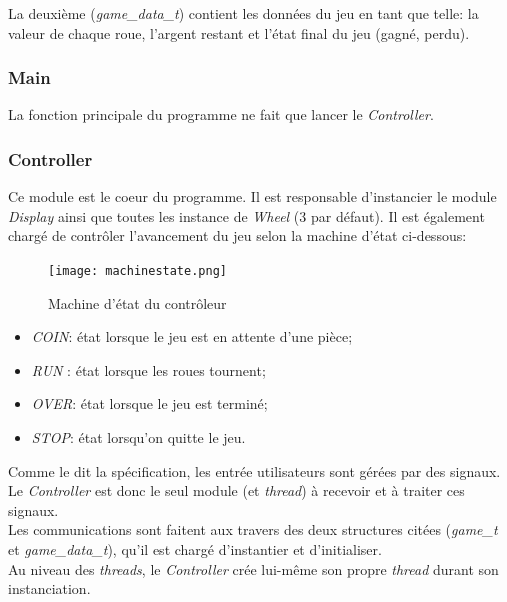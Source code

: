 \documentclass[11pt, a4paper]{article}
\begin{document}
La deuxième (\textit{game\_data\_t}) contient les données du jeu en tant que telle:
la valeur de chaque roue, l'argent restant et l'état final du jeu (gagné, perdu).

\subsubsection{Main}
La fonction principale du programme ne fait que lancer le \textit{Controller}.

\newpage

\subsubsection{Controller}
Ce module est le coeur du programme.
Il est responsable d'instancier le module \textit{Display} ainsi que toutes les instance de \textit{Wheel} (3 par défaut).
Il est également chargé de contrôler l'avancement du jeu selon la machine d'état ci-dessous:

\begin{figure}[H]
    \begin{center}
        \texttt{[image: machinestate.png]}
    \end{center}
    \caption{Machine d'état du contrôleur}
    \label{Machine d'état du contrôleur}
\end{figure}

\begin{itemize}
    \item \textit{COIN}: état lorsque le jeu est en attente d'une pièce;
    \item \textit{RUN} : état lorsque les roues tournent;
    \item \textit{OVER}: état lorsque le jeu est terminé;
    \item \textit{STOP}: état lorsqu'on quitte le jeu. \\
\end{itemize}

Comme le dit la spécification, les entrée utilisateurs sont gérées par des signaux.
Le \textit{Controller} est donc le seul module (et \textit{thread}) à recevoir et à traiter ces signaux. \\

Les communications sont faitent aux travers des deux structures citées (\textit{game\_t} et \textit{game\_data\_t}),
qu'il est chargé d'instantier et d'initialiser. \\

Au niveau des \textit{threads}, le \textit{Controller} crée lui-même son propre \textit{thread} durant son instanciation.
\end{document}
